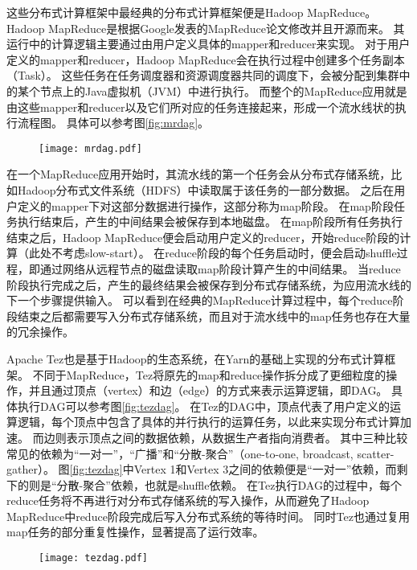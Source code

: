 这些分布式计算框架中最经典的分布式计算框架便是Hadoop MapReduce\cite{hadoop}。
Hadoop MapReduce是根据Google发表的MapReduce\cite{mapreduce}论文修改并且开源而来。
其运行中的计算逻辑主要通过由用户定义具体的mapper和reducer来实现。
对于用户定义的mapper和reducer，Hadoop MapReduce会在执行过程中创建多个任务副本（Task）。
这些任务在任务调度器和资源调度器共同的调度下，会被分配到集群中的某个节点上的Java虚拟机（JVM）中进行执行。
而整个的MapReduce应用就是由这些mapper和reducer以及它们所对应的任务连接起来，形成一个流水线状的执行流程图。
具体可以参考图\ref{fig:mrdag}。

\begin{figure}[!htp]
    \centering
    \texttt{[image: mrdag.pdf]}
\end{figure}

在一个MapReduce应用开始时，其流水线的第一个任务会从分布式存储系统，比如Hadoop分布式文件系统（HDFS）中读取属于该任务的一部分数据。
之后在用户定义的mapper下对这部分数据进行操作，这部分称为map阶段。
在map阶段任务执行结束后，产生的中间结果会被保存到本地磁盘。
在map阶段所有任务执行结束之后，Hadoop MapReduce便会启动用户定义的reducer，开始reduce阶段的计算（此处不考虑slow-start）。
在reduce阶段的每个任务启动时，便会启动shuffle过程，即通过网络从远程节点的磁盘读取map阶段计算产生的中间结果。
当reduce阶段执行完成之后，产生的最终结果会被保存到分布式存储系统，为应用流水线的下一个步骤提供输入。
可以看到在经典的MapReduce计算过程中，每个reduce阶段结束之后都需要写入分布式存储系统，而且对于流水线中的map任务也存在大量的冗余操作。

Apache Tez\cite{tez}也是基于Hadoop的生态系统，在Yarn的基础上\cite{yarn}实现的分布式计算框架。
不同于MapReduce，Tez将原先的map和reduce操作拆分成了更细粒度的操作，并且通过顶点（vertex）和边（edge）的方式来表示运算逻辑，即DAG。
具体执行DAG可以参考图\ref{fig:tezdag}。
在Tez的DAG中，顶点代表了用户定义的运算逻辑，每个顶点中包含了具体的并行执行的运算任务，以此来实现分布式计算加速。
而边则表示顶点之间的数据依赖，从数据生产者指向消费者。
其中三种比较常见的依赖为“一对一”，“广播”和“分散-聚合”（one-to-one, broadcast, scatter-gather）。
图\ref{fig:tezdag}中Vertex 1和Vertex 3之间的依赖便是“一对一”依赖，而剩下的则是“分散-聚合”依赖，也就是shuffle依赖。
在Tez执行DAG的过程中，每个reduce任务将不再进行对分布式存储系统的写入操作，从而避免了Hadoop MapReduce中reduce阶段完成后写入分布式系统的等待时间。
同时Tez也通过复用map任务的部分重复性操作，显著提高了运行效率。

\begin{figure}[!htp]
    \centering
    \texttt{[image: tezdag.pdf]}
\end{figure}

